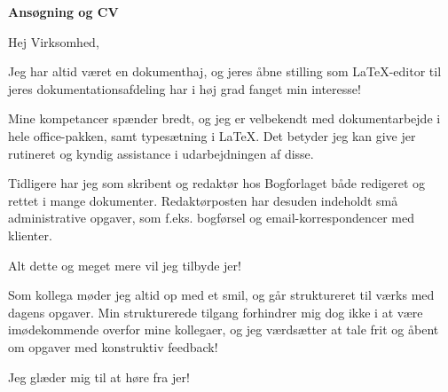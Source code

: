 \documentclass[a4paper, hidelinks]{twentysecondcv} %
\begin{document}




\makeprofile %
\textbf{\Huge\color{mainblue} Ansøgning og CV}

Hej Virksomhed,

Jeg har altid været en dokumenthaj, og jeres åbne stilling som \textrm{\large \LaTeX}-editor til jeres dokumentationsafdeling har i høj grad fanget min interesse!

Mine kompetancer spænder bredt, og jeg er velbekendt med dokumentarbejde i hele office-pakken, samt typesætning i \textrm{\large \LaTeX}. Det betyder jeg kan give jer rutineret og kyndig assistance i udarbejdningen af disse.

Tidligere har jeg som skribent og redaktør hos Bogforlaget både redigeret og rettet i mange dokumenter. Redaktørposten har desuden indeholdt små administrative opgaver, som f.eks. bogførsel og email-korrespondencer med klienter.

Alt dette og meget mere vil jeg tilbyde jer!

Som kollega møder jeg altid op med et smil, og går struktureret til værks med dagens opgaver. Min strukturerede tilgang forhindrer mig dog ikke i at være imødekommende overfor mine kollegaer, og jeg værdsætter at tale frit og åbent om opgaver med konstruktiv feedback!

Jeg glæder mig til at høre fra jer!
\end{document}
